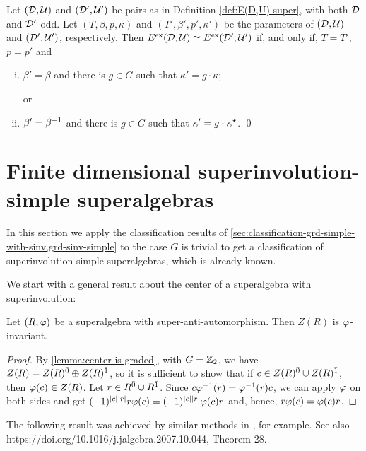 \begin{thm}\label{thm:iso-D-odd-ExEsop}
    Let $(\mathcal{D}, \mathcal U)$ and $(\mathcal{D}', \mathcal U')$ be pairs as in Definition \ref{def:E(D,U)-super}, with both $\mathcal{D}$ and $\mathcal{D}'$ odd. 
    Let $(T, \beta, p, \kappa)$ and $(T', \beta', p', \kappa')$ be the parameters of $(\mathcal{D}, \mathcal U)$ and $(\mathcal{D}', \mathcal U')$, respectively. 
	Then $E^{\mathrm{ex}}(\mathcal{D}, \mathcal U) \simeq E^{\mathrm{ex}}(\mathcal{D}', \mathcal U')$ if, and only if, $T=T'$, $p = p'$ and
	\begin{enumerate}[(i)]
	    \item $\beta'=\beta$ and there is $g\in G$ such that $\kappa' = g \cdot \kappa$;
	    
	    or
	    \item $\beta'=\beta^{-1}$ and there is $g\in G$ such that $\kappa' = g \cdot \kappa^\star$. \qed
	\end{enumerate}
\end{thm}

\section[Finite dimensional superinvolution-simple superalgebras]{Finite dimensional superinvolution-simple superalgebras}

In this section we apply the classification results of \cref{sec:classification-grd-simple-with-sinv,grd-sinv-simple} to the case $G$ is trivial to get a classification of superinvolution-simple superalgebras, which is already known. 

We start with a general result about the center of a superalgebra with superinvolution: 

\begin{lemma}
	Let $(R, \varphi)$ be a superalgebra with super-anti-automorphism.
	Then $Z(R)$ is $\varphi$-invariant.
\end{lemma}

\begin{proof}
	By \cref{lemma:center-is-graded}, with $G = \mathbb{Z}_2$, we have $Z(R) = Z(R)^{\bar0} \oplus Z(R)^{\bar1}$, so it is sufficient to show that if $c \in Z(R)^{\bar0} \cup Z(R)^{\bar1}$, then $\varphi(c) \in Z(R)$. 
	Let $r \in R^{\bar0} \cup R^{\bar1}$.
	Since $c\varphi^{-1} (r) = \varphi^{-1} (r)c$, we can apply $\varphi$ on both sides and get $(-1)^{|c||r|} r \varphi(c) = (-1)^{|c||r|} \varphi(c) r$ and, hence, $r \varphi(c) = \varphi(c) r$.
\end{proof}

The following result was achieved by similar methods in \cite[Theorem 8.1]{Sh98}, for example. 
See also https://doi.org/10.1016/j.jalgebra.2007.10.044, Theorem 28.

